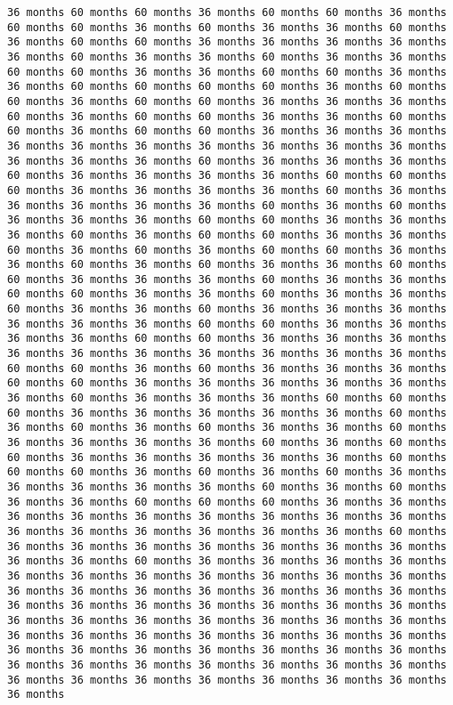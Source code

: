 \documentclass[11pt]{article}
\begin{document}
\begin{Verbatim}[commandchars=\\\{\}, frame=single, framerule=2mm, rulecolor=\color{outerrorbackground}]
36 months 60 months 60 months 36 months 60 months 60 months 36 months 60 months 60 months 36 months 60 months 36 months 36 months 60 months 36 months 60 months 60 months 36 months 36 months 36 months 36 months 36 months 60 months 36 months 36 months 60 months 36 months 36 months 60 months 60 months 36 months 36 months 60 months 60 months 36 months 36 months 60 months 60 months 60 months 60 months 36 months 60 months 60 months 36 months 60 months 60 months 36 months 36 months 36 months 60 months 36 months 60 months 60 months 36 months 36 months 60 months 60 months 36 months 60 months 60 months 36 months 36 months 36 months 36 months 36 months 36 months 36 months 36 months 36 months 36 months 36 months 36 months 36 months 60 months 36 months 36 months 36 months 60 months 36 months 36 months 36 months 36 months 60 months 60 months 60 months 36 months 36 months 36 months 36 months 60 months 36 months 36 months 36 months 36 months 36 months 60 months 36 months 60 months 36 months 36 months 36 months 60 months 60 months 36 months 36 months 36 months 60 months 36 months 60 months 60 months 36 months 36 months 60 months 36 months 60 months 36 months 60 months 60 months 36 months 36 months 60 months 36 months 60 months 36 months 36 months 60 months 60 months 36 months 36 months 36 months 60 months 36 months 36 months 60 months 60 months 36 months 36 months 60 months 36 months 36 months 60 months 36 months 36 months 60 months 36 months 36 months 36 months 36 months 36 months 36 months 60 months 60 months 36 months 36 months 36 months 36 months 60 months 60 months 36 months 36 months 36 months 36 months 36 months 36 months 36 months 36 months 36 months 36 months 60 months 60 months 36 months 60 months 36 months 36 months 36 months 60 months 60 months 36 months 36 months 36 months 36 months 36 months 36 months 60 months 36 months 36 months 36 months 60 months 60 months 60 months 36 months 36 months 36 months 36 months 36 months 60 months 36 months 60 months 36 months 60 months 36 months 36 months 60 months 36 months 36 months 36 months 36 months 60 months 36 months 60 months 60 months 36 months 36 months 36 months 36 months 36 months 60 months 60 months 60 months 36 months 60 months 36 months 60 months 36 months 36 months 36 months 36 months 36 months 60 months 36 months 60 months 36 months 36 months 60 months 60 months 60 months 36 months 36 months 36 months 36 months 36 months 36 months 36 months 36 months 36 months 36 months 36 months 36 months 36 months 36 months 36 months 60 months 36 months 36 months 36 months 36 months 36 months 36 months 36 months 36 months 36 months 60 months 36 months 36 months 36 months 36 months 36 months 36 months 36 months 36 months 36 months 36 months 36 months 36 months 36 months 36 months 36 months 36 months 36 months 36 months 36 months 36 months 36 months 36 months 36 months 36 months 36 months 36 months 36 months 36 months 36 months 36 months 36 months 36 months 36 months 36 months 36 months 36 months 36 months 36 months 36 months 36 months 36 months 36 months 36 months 36 months 36 months 36 months 36 months 36 months 36 months 36 months 36 months 36 months 36 months 36 months 36 months 36 months 36 months 36 months 36 months 36 months 36 months 
\end{Verbatim}
\end{document}
